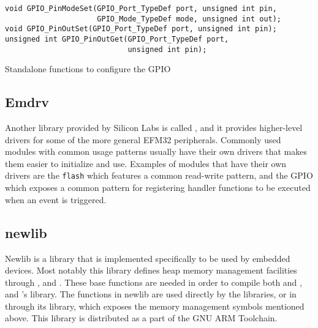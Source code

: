 \begin{listing}[H]
  \begin{verbatim}
void GPIO_PinModeSet(GPIO_Port_TypeDef port, unsigned int pin,
                     GPIO_Mode_TypeDef mode, unsigned int out);
void GPIO_PinOutSet(GPIO_Port_TypeDef port, unsigned int pin);
unsigned int GPIO_PinOutGet(GPIO_Port_TypeDef port,
                            unsigned int pin);
  \end{verbatim}
  \caption{Standalone functions to configure the GPIO}
  \label{lst:back:lib:gpio}
\end{listing}

\subsection{Emdrv}

Another library provided by Silicon Labs is called , and it provides higher-level drivers for some of the more general EFM32 peripherals.
Commonly used modules with common usage patterns usually have their own drivers that makes them easier to initialize and use.
Examples of modules that have their own drivers are the \texttt{flash} which features a common read-write pattern, and the GPIO which exposes a common pattern for registering handler functions to be executed when an event is triggered.

\subsection{newlib}

Newlib is a {\C} library that is implemented specifically to be used by embedded devices.
Most notably this library defines heap memory management facilities through ,  and .
These base functions are needed in order to compile both \emlib and , and {\rust}'s  library.
The functions in newlib are used directly by the {\C} libraries, or in {\rust} through its  library, which exposes the memory management symbols mentioned above.
This library is distributed as a part of the GNU ARM Toolchain.
